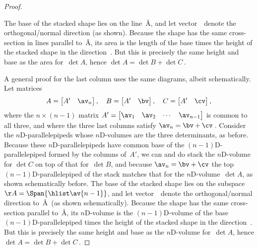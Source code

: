 \begin{proof}
\begin{center}
\end{center}
The base of the stacked shape lies on the line~\AA, and let vector~\nv\ denote the orthogonal\slash normal direction (as shown).
Because the shape has the same cross-section in lines parallel to~\AA, its area is the length of the base times the height of the stacked shape in the direction~\nv.
But this is precisely the same height and base as the area for~\(\det A\), hence \(\det A=\det B+\det C\)\,.

A general proof for the last column uses the same diagrams, albeit schematically. 
Let matrices
\begin{equation*}
A=\begin{bmatrix} A'& \av_n \end{bmatrix},\quad
B=\begin{bmatrix} A'& \bv \end{bmatrix},\quad
C=\begin{bmatrix} A'& \cv \end{bmatrix},
\end{equation*}
where the \(n\times(n-1)\) matrix \(A'=\begin{bmatrix} \av_1&\av_2&\cdots&\av_{n-1} \end{bmatrix}\) is common to all three,
and where the three last columns satisfy \(\av_n=\bv+\cv\)\,.
Consider the \(n\)D-parallelepipeds whose \(n\)D-volumes are the three determinants, as before.
Because these \(n\)D-parallelepipeds have common base of the \((n-1)\)D-parallelepiped formed by the columns of~\(A'\), we can and do stack the \(n\)D-volume for \(\det C\) on top of that for~\(\det B\), and because \(\av_n=\bv+\cv\) the top \((n-1)\)D-parallelepiped of the stack matches that for the \(n\)D-volume~\(\det A\), as shown schematically before.
The base of the stacked shape lies on the subspace \(\AA=\Span\{\hlist\av{n-1}\}\), and let vector~\nv\ denote the orthogonal\slash normal direction to~\AA\ (as shown schematically).
Because the shape has the same cross-section parallel to~\AA, its \(n\)D-volume is the \((n-1)\)D-volume of the base \((n-1)\)D-parallelepiped times the height of the stacked shape in the direction~\nv.
But this is precisely the same height and base as the \(n\)D-volume for~\(\det A\), hence \(\det A=\det B+\det C\)\,.


\end{proof}
